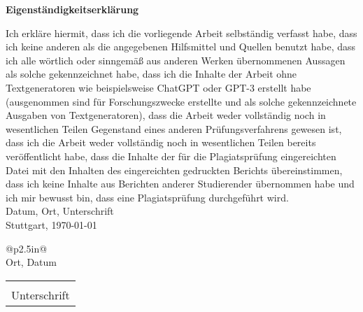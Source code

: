 \documentclass[a4paper, 12pt]{proc}
\begin{document}
\begin{center}
	\textbf{Eigenständigkeitserklärung}
\end{center}
Ich erkläre hiermit, dass ich die vorliegende Arbeit selbständig verfasst habe,
dass ich keine anderen als die angegebenen Hilfsmittel und Quellen benutzt habe,
dass ich alle wörtlich oder sinngemäß aus anderen Werken übernommenen Aussagen
als solche gekennzeichnet habe, dass ich die Inhalte der Arbeit ohne
Textgeneratoren wie beispielsweise ChatGPT oder GPT-3 erstellt habe (ausgenommen
sind für Forschungszwecke erstellte und als solche gekennzeichnete Ausgaben von
Textgeneratoren), dass die Arbeit weder vollständig noch in wesentlichen Teilen
Gegenstand eines anderen Prüfungsverfahrens gewesen ist, dass ich die Arbeit
weder vollständig noch in wesentlichen Teilen bereits veröffentlicht habe, dass
die Inhalte der für die Plagiatsprüfung eingereichten Datei mit den Inhalten des
eingereichten gedruckten Berichts übereinstimmen, dass ich keine Inhalte aus
Berichten anderer Studierender übernommen habe und ich mir bewusst bin, dass
eine Plagiatsprüfung durchgeführt wird.\\

Datum, Ort, Unterschrift\\

\vspace{25mm}
\hspace{1cm}
Stuttgart, \today \\
\begin{minipage}{0.5\linewidth}
	\centering
	\begin{tabular}{@{}p{2.5in}@{}}
		\hrulefill \\
		Ort, Datum \\
	\end{tabular}
\end{minipage}
\vspace{25mm}
\begin{minipage}{0.5\linewidth}
	\centering
	\begin{tabular}{@{}p{2.5in}@{}}
		\hrulefill   \\
		Unterschrift \\
	\end{tabular}
\end{minipage}
\end{document}

